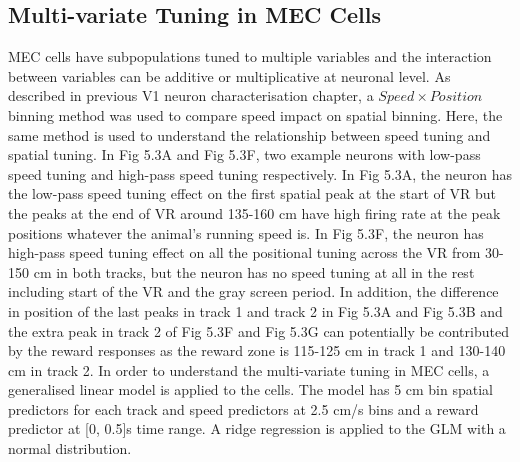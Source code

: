 \subsection{Multi-variate Tuning in MEC Cells}
MEC cells have subpopulations tuned to multiple variables and the interaction between variables can be additive or multiplicative at neuronal level. As described in previous V1 neuron characterisation chapter, a \(Speed \times Position \) binning method was used to compare speed impact on spatial binning. Here, the same method is used to understand the relationship between speed tuning and spatial tuning. In Fig 5.3A and Fig 5.3F, two example neurons with low-pass speed tuning and high-pass speed tuning respectively. In Fig 5.3A, the neuron has the low-pass speed tuning effect on the first spatial peak at the start of VR but the peaks at the end of VR around 135-160 cm have high firing rate at the peak positions whatever the animal's running speed is. In Fig 5.3F, the neuron has high-pass speed tuning effect on all the positional tuning across the VR from 30-150 cm in both tracks, but the neuron has no speed tuning at all in the rest including start of the VR and the gray screen period. In addition, the difference in position of the last peaks in track 1 and track 2 in Fig 5.3A and Fig 5.3B and the extra peak in track 2 of Fig 5.3F and Fig 5.3G can potentially be contributed by the reward responses as the reward zone is 115-125 cm in track 1 and 130-140 cm in track 2. In order to understand the multi-variate tuning in MEC cells, a generalised linear model is applied to the cells. The model has 5 cm bin spatial predictors for each track and speed predictors at 2.5 cm/s bins and a reward predictor at [0, 0.5]s time range. A ridge regression is applied to the GLM with a normal distribution. 
